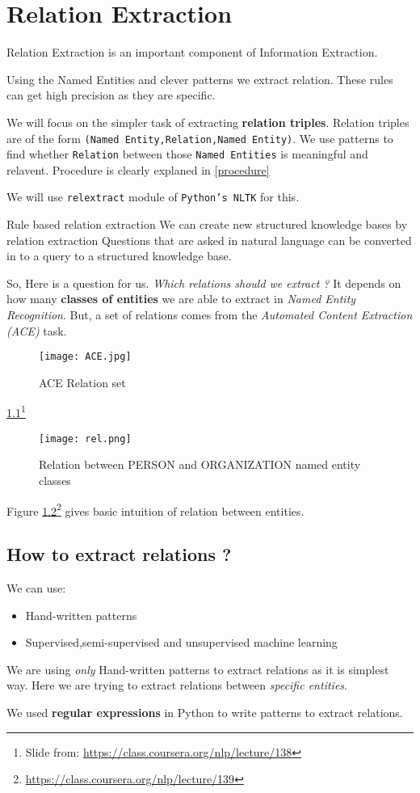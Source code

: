 \documentclass[12pt]{report}
\begin{document}
\chapter{Relation Extraction}
\par Relation Extraction is an important component of Information Extraction.
\par Using the Named Entities and clever patterns we extract relation. These rules can 
get high precision as they are specific.
\par We will focus on the simpler task of extracting \textbf{relation triples}. Relation
triples are of the form \texttt{(Named Entity,Relation,Named Entity)}.
We use patterns to find whether \texttt{Relation} between those \texttt{Named Entities}
 is meaningful and relavent. Procedure is clearly explaned in \ref{procedure}
\par We will use \texttt{relextract} module of \texttt{Python's NLTK} for this.
\par Rule based relation extraction
We can create new structured knowledge bases by relation extraction
Questions that are asked in natural language can be converted in to a query to a structured
knowledge base.\\
\par So, Here is a question for us. \textit{Which relations should we extract ?} It depends
on how many \textbf{classes of entities} we are able to extract in \textit{Named Entity Recognition}.
But, a set of relations  comes from the \textit{Automated Content Extraction (ACE)} task.
\begin{figure}[htp]
\centering
\texttt{[image: ACE.jpg]}
\caption{ACE Relation set}
\label{ACE}
\end{figure}
\ref{ACE}\footnote{Slide from: \url{https://class.coursera.org/nlp/lecture/138}}
\begin{figure}[htp]
\centering
\texttt{[image: rel.png]}
\caption{Relation between PERSON and ORGANIZATION named entity classes}
\label{IE}
\end{figure}

Figure \ref{IE}\footnote{\url{https://class.coursera.org/nlp/lecture/139}} gives basic intuition of relation between entities.

\section{How to extract relations ?}
We can use:
\begin{itemize}
\item Hand-written patterns
\item Supervised,semi-supervised and unsupervised machine learning
\end{itemize}
We are using \textit{only} Hand-written patterns to extract relations as it is simplest
way. Here we are trying to extract relations between \textit{specific entities}.
\par We used \textbf{regular expressions } \cite{re} in Python to write patterns to extract relations.
\end{document}
